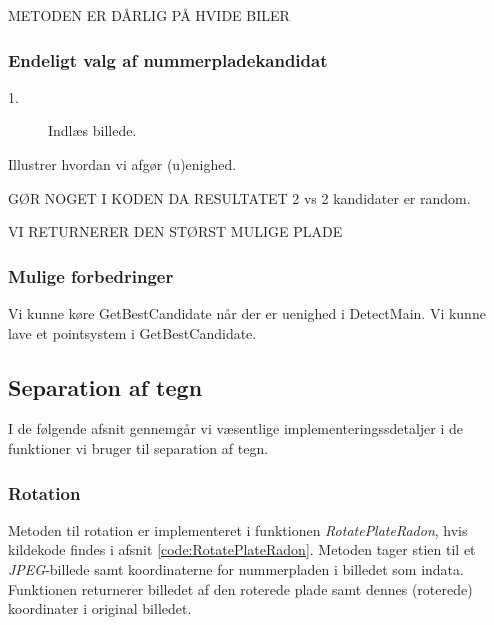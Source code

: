 METODEN ER DÅRLIG PÅ HVIDE BILER




\subsubsection{Endeligt valg af nummerpladekandidat}
\begin{description}
\item[1.] Indlæs billede.
\end{description}


Illustrer hvordan vi afgør (u)enighed. 

GØR NOGET I KODEN DA RESULTATET 2 vs 2 kandidater er random.

VI RETURNERER DEN STØRST MULIGE PLADE

\subsubsection{Mulige forbedringer}
Vi kunne køre GetBestCandidate når der er uenighed i DetectMain.
Vi kunne lave et pointsystem i GetBestCandidate.


\subsection{Separation af tegn}

I de følgende afsnit gennemgår vi væsentlige implementeringssdetaljer i de funktioner vi bruger til separation af tegn. 

\subsubsection{Rotation}
\label{sec:implementation/sep/rotation}

Metoden til rotation er implementeret i funktionen \textit{RotatePlateRadon}, hvis kildekode findes i afsnit \vref{code:RotatePlateRadon}. Metoden tager stien til et \textit{JPEG}-billede samt koordinaterne for nummerpladen i billedet som indata. Funktionen returnerer billedet af den roterede plade samt dennes (roterede) koordinater i original billedet.

